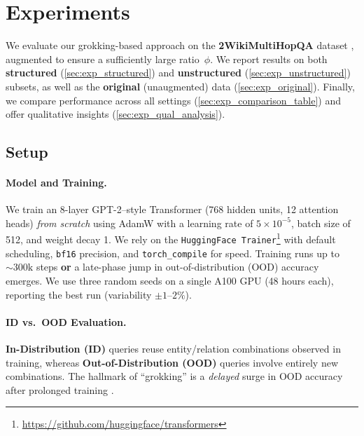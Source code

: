 
\section{Experiments}\label{sec:experiments}

    We evaluate our grokking-based approach on the \textbf{2WikiMultiHopQA} dataset \citep{ho_2WikiMultiHopQA_2020}, 
    augmented to ensure a sufficiently large ratio~\(\phi\). 
    We report results on both \textbf{structured} (\ref{sec:exp_structured}) and \textbf{unstructured} (\ref{sec:exp_unstructured}) subsets, 
    as well as the \textbf{original} (unaugmented) data (\ref{sec:exp_original}). 
    Finally, we compare performance across all settings (\ref{sec:exp_comparison_table}) 
    and offer qualitative insights (\ref{sec:exp_qual_analysis}).
    
    \subsection{Setup}\label{sec:exp_setup}
        \paragraph{Model and Training.}
            We train an 8-layer GPT-2--style Transformer (768 hidden units, 12 attention heads) \emph{from scratch} using AdamW \cite{loshchilov2017fixing} 
            with a learning rate of $5\times10^{-5}$, batch size of 512, and weight decay 1. 
            We rely on the \texttt{HuggingFace Trainer}\footnote{\url{https://github.com/huggingface/transformers}} with default scheduling, 
            \texttt{bf16} precision, and \texttt{torch\_compile} for speed. 
            Training runs up to \(\sim\!300\text{k}\) steps \textbf{or} a late-phase jump in out-of-distribution (OOD) accuracy emerges.
            We use three random seeds on a single A100 GPU (48 hours each), 
            reporting the best run (variability $\pm 1\text{--}2\%$).
            
        \paragraph{ID vs.\ OOD Evaluation.}
            \textbf{In-Distribution (ID)} queries reuse entity/relation combinations observed in training, 
            whereas \textbf{Out-of-Distribution (OOD)} queries involve entirely new combinations. 
            The hallmark of ``grokking'' is a \emph{delayed} surge in OOD accuracy after prolonged training \citep{power2022grokking}.
            
